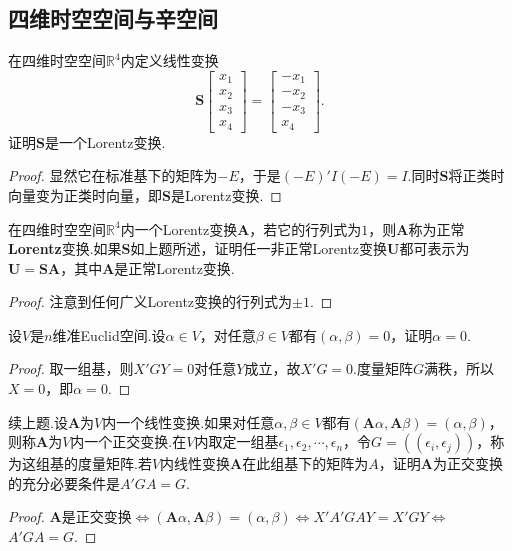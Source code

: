 \subsection{四维时空空间与辛空间}
\begin{prob}[1]
	在四维时空空间$\mathbb{R}^4$内定义线性变换
	\[
		\bm S\begin{bmatrix}
			x_1 \\
			x_2 \\
			x_3 \\
			x_4
		\end{bmatrix}=\begin{bmatrix}
			-x_1 \\
			-x_2 \\
			-x_3 \\
			x_4
		\end{bmatrix}.
	\]
	证明$\bm S$是一个Lorentz变换.
\end{prob}
\begin{proof}
	显然它在标准基下的矩阵为$-E$，于是$(-E)'I(-E)=I$.同时$\bm S$将正类时向量变为正类时向量，即$\bm S$是Lorentz变换.
\end{proof}
\begin{prob}[2]
	在四维时空空间$\mathbb{R}^4$内一个Lorentz变换$\bm A$，若它的行列式为$1$，则$\bm A$称为{\heiti 正常\textbf{Lorentz}变换}.如果$\bm S$如上题所述，证明任一非正常Lorentz变换$\bm U$都可表示为$\bm U=\bm S\bm A$，其中$\bm A$是正常Lorentz变换.
\end{prob}
\begin{proof}
	注意到任何广义Lorentz变换的行列式为$\pm 1$.
\end{proof}
\begin{prob}[3]
	设$V$是$n$维准Euclid空间.设$\alpha\in V$，对任意$\beta\in V$都有$(\alpha,\beta)=0$，证明$\alpha=0$.
\end{prob}
\begin{proof}
	取一组基，则$X'GY=0$对任意$Y$成立，故$X'G=0$.度量矩阵$G$满秩，所以$X=0$，即$\alpha=0$.
\end{proof}
\begin{prob}[4]
	续上题.设$\bm A$为$V$内一个线性变换.如果对任意$\alpha,\beta\in V$都有$(\bm A\alpha,\bm A\beta)=(\alpha,\beta)$，则称$\bm A$为$V$内一个{\heiti 正交变换}.在$V$内取定一组基$\epsilon_1,\epsilon_2,\cdots,\epsilon_n$，令$G=((\epsilon_i,\epsilon_j))$，称为这组基的{\heiti 度量矩阵}.若$V$内线性变换$\bm A$在此组基下的矩阵为$A$，证明$\bm A$为正交变换的充分必要条件是$A'GA=G$.
\end{prob}
\begin{proof}
	$\bm A$是正交变换$\Longleftrightarrow$$(\bm A\alpha,\bm A\beta)=(\alpha,\beta)$$\Longleftrightarrow$$X'A'GAY=X'GY$$\Longleftrightarrow$$A'GA=G$.
\end{proof}

